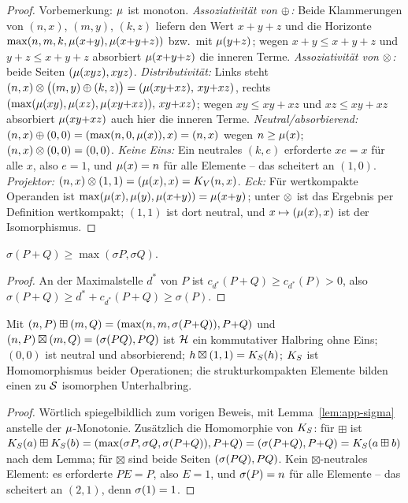 \begin{proof}
Vorbemerkung: $\mu$ ist monoton. \emph{Assoziativität von
$\oplus$:} Beide Klammerungen von $(n,x)$, $(m,y)$, $(k,z)$ liefern
den Wert $x{+}y{+}z$ und die Horizonte
$\max(n,m,k,\mu(x{+}y),\mu(x{+}y{+}z))$ bzw.\ mit $\mu(y{+}z)$;
wegen $x{+}y\le x{+}y{+}z$ und $y{+}z\le x{+}y{+}z$ absorbiert
$\mu(x{+}y{+}z)$ die inneren Terme. \emph{Assoziativität von
$\otimes$:} beide Seiten $(\mu(xyz),xyz)$.
\emph{Distributivität:} Links steht
$(n,x)\otimes\bigl((m,y)\oplus(k,z)\bigr)
=(\mu(xy{+}xz),\,xy{+}xz)$, rechts
$(\max(\mu(xy),\mu(xz),\mu(xy{+}xz)),\,xy{+}xz)$; wegen
$xy\le xy{+}xz$ und $xz\le xy{+}xz$ absorbiert $\mu(xy{+}xz)$
auch hier die inneren Terme.
\emph{Neutral/absorbierend:} $(n,x)\oplus(0,0)=(\max(n,0,\mu(x)),x)
=(n,x)$ wegen $n\ge\mu(x)$; $(n,x)\otimes(0,0)=(0,0)$.
\emph{Keine Eins:} Ein neutrales $(k,e)$ erforderte $xe=x$ für alle
$x$, also $e=1$, und $\mu(x)=n$ für alle Elemente -- das scheitert
an $(1,0)$. \emph{Projektor:}
$(n,x)\otimes(1,1)=(\mu(x),x)=K_V(n,x)$. \emph{Eck:} Für
wertkompakte Operanden ist
$\max(\mu(x),\mu(y),\mu(x{+}y))=\mu(x{+}y)$; unter $\otimes$ ist
das Ergebnis per Definition wertkompakt; $(1,1)$ ist dort neutral,
und $x\mapsto(\mu(x),x)$ ist der Isomorphismus.
\end{proof}

\begin{lemma}\label{lem:app-sigma}
$\sigma(P{+}Q)\ge\max(\sigma P,\sigma Q)$.
\end{lemma}

\begin{proof}
An der Maximalstelle $d^*$ von $P$ ist
$c_{d^*}(P{+}Q)\ge c_{d^*}(P)>0$, also
$\sigma(P{+}Q)\ge d^*+c_{d^*}(P{+}Q)\ge\sigma(P)$.
\end{proof}

\begin{satz}
Mit $(n,P)\boxplus(m,Q)=(\max(n,m,\sigma(P{+}Q)),P{+}Q)$ und
$(n,P)\boxtimes(m,Q)=(\sigma(PQ),PQ)$ ist $\mathcal H$ ein kommutativer
Halbring ohne Eins; $(0,0)$ ist neutral und absorbierend;
$h\boxtimes(1,1)=K_S(h)$; $K_S$ ist Homomorphismus beider
Operationen; die strukturkompakten Elemente bilden einen zu
$\mathcal S$ isomorphen Unterhalbring.
\end{satz}

\begin{proof}
Wörtlich spiegelbildlich zum vorigen Beweis, mit
Lemma~\ref{lem:app-sigma} anstelle der $\mu$-Monotonie. Zusätzlich
die Homomorphie von $K_S$: für $\boxplus$ ist
$K_S(a)\boxplus K_S(b)=(\max(\sigma P,\sigma Q,\sigma(P{+}Q)),P{+}Q)
=(\sigma(P{+}Q),P{+}Q)=K_S(a\boxplus b)$ nach dem Lemma; für
$\boxtimes$ sind beide Seiten $(\sigma(PQ),PQ)$. Kein
$\boxtimes$-neutrales Element: es erforderte $PE=P$, also $E=1$,
und $\sigma(P)=n$ für alle Elemente -- das scheitert an $(2,1)$,
denn $\sigma(1)=1$.
\end{proof}


